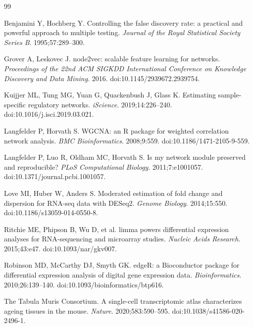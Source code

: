 \documentclass[11pt]{article}
\begin{document}
\clearpage
\begin{thebibliography}{99}\small

 Benjamini Y, Hochberg Y. Controlling the false discovery rate: a practical and powerful approach to multiple testing. \emph{Journal of the Royal Statistical Society Series B}. 1995;57:289--300.

 Grover A, Leskovec J. node2vec: scalable feature learning for networks. \emph{Proceedings of the 22nd ACM SIGKDD International Conference on Knowledge Discovery and Data Mining}. 2016. doi:10.1145/2939672.2939754.

 Kuijjer ML, Tung MG, Yuan G, Quackenbush J, Glass K. Estimating sample-specific regulatory networks. \emph{iScience}. 2019;14:226--240. doi:10.1016/j.isci.2019.03.021.

 Langfelder P, Horvath S. WGCNA: an R package for weighted correlation network analysis. \emph{BMC Bioinformatics}. 2008;9:559. doi:10.1186/1471-2105-9-559.

 Langfelder P, Luo R, Oldham MC, Horvath S. Is my network module preserved and reproducible? \emph{PLoS Computational Biology}. 2011;7:e1001057. doi:10.1371/journal.pcbi.1001057.

 Love MI, Huber W, Anders S. Moderated estimation of fold change and dispersion for RNA-seq data with DESeq2. \emph{Genome Biology}. 2014;15:550. doi:10.1186/s13059-014-0550-8.

 Ritchie ME, Phipson B, Wu D, et al. limma powers differential expression analyses for RNA-sequencing and microarray studies. \emph{Nucleic Acids Research}. 2015;43:e47. doi:10.1093/nar/gkv007.

 Robinson MD, McCarthy DJ, Smyth GK. edgeR: a Bioconductor package for differential expression analysis of digital gene expression data. \emph{Bioinformatics}. 2010;26:139--140. doi:10.1093/bioinformatics/btp616.

 The Tabula Muris Consortium. A single-cell transcriptomic atlas characterizes ageing tissues in the mouse. \emph{Nature}. 2020;583:590--595. doi:10.1038/s41586-020-2496-1.

\end{thebibliography}
\end{document}
